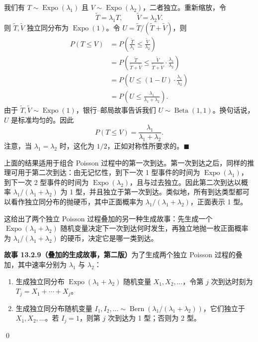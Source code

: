 \documentclass[UTF8,12pt,a4paper,fontset=fandol]{ctexart}
\begin{document}
我们有 $T\sim\operatorname{Expo}(\lambda_1)$ 且 $V\sim\operatorname{Expo}(\lambda_2)$，二者独立。重新缩放，令
\[
  \tilde T=\lambda_1T,\qquad \tilde V=\lambda_2V.
\]
则 $\tilde T,\tilde V$ 独立同分布为 $\operatorname{Expo}(1)$。令 $U=\tilde T/(\tilde T+\tilde V)$，则
\[
\begin{aligned}
  P(T\le V)
  &=P\left(\frac{\tilde T}{\lambda_1}\le \frac{\tilde V}{\lambda_2}\right)\\
  &=P\left(\frac{\tilde T}{\tilde T+\tilde V}
    \le
    \frac{\tilde V}{\tilde T+\tilde V}\cdot\frac{\lambda_1}{\lambda_2}\right)\\
  &=P\left(U\le (1-U)\cdot\frac{\lambda_1}{\lambda_2}\right)\\
  &=P\left(U\le \frac{\lambda_1}{\lambda_1+\lambda_2}\right).
\end{aligned}
\]
由于 $\tilde T,\tilde V\sim\operatorname{Expo}(1)$，银行--邮局故事告诉我们 $U\sim\operatorname{Beta}(1,1)$。换句话说，$U$ 是标准均匀的。因此
\[
  P(T\le V)=\frac{\lambda_1}{\lambda_1+\lambda_2}.
\]
注意，当 $\lambda_1=\lambda_2$ 时，这化为 $1/2$，正如对称性所要求的。$\blacksquare$

上面的结果适用于组合 Poisson 过程中的第一次到达。第一次到达之后，同样的推理可用于第二次到达：由无记忆性，到下一次 1 型事件的时间为 $\operatorname{Expo}(\lambda_1)$，到下一次 2 型事件的时间为 $\operatorname{Expo}(\lambda_2)$，且与过去独立。因此第二次到达以概率 $\lambda_1/(\lambda_1+\lambda_2)$ 为 1 型，并且独立于第一次到达。类似地，所有到达类型都可以看作独立同分布的抛硬币，其中正面概率为 $\lambda_1/(\lambda_1+\lambda_2)$，正面表示 1 型。

这给出了两个独立 Poisson 过程叠加的另一种生成故事：先生成一个 $\operatorname{Expo}(\lambda_1+\lambda_2)$ 随机变量决定下一次到达何时发生，再独立地抛一枚正面概率为 $\lambda_1/(\lambda_1+\lambda_2)$ 的硬币，决定它是哪一类到达。

\noindent\textbf{故事 13.2.9（叠加的生成故事，第二版）}\quad 为了生成两个独立 Poisson 过程的叠加，其中速率分别为 $\lambda_1$ 与 $\lambda_2$：
\begin{enumerate}
  \item 生成独立同分布 $\operatorname{Expo}(\lambda_1+\lambda_2)$ 随机变量 $X_1,X_2,\ldots$，令第 $j$ 次到达时刻为 $T_j=X_1+\cdots+X_j$。
  \item 生成独立同分布随机变量 $I_1,I_2,\ldots\sim\operatorname{Bern}(\lambda_1/(\lambda_1+\lambda_2))$，它们独立于 $X_1,X_2,\ldots$。若 $I_j=1$，则第 $j$ 次到达为 1 型；否则为 2 型。
\end{enumerate}
\qed
\end{document}
